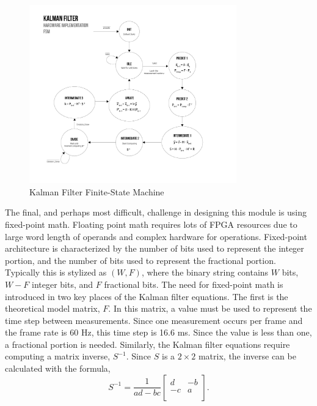\documentclass[11pt]{article} %
\begin{document}
\FloatBarrier
\begin{figure}[h]
\centering
\includegraphics[width=0.8\textwidth]{./images/kalman_fsm.jpg}
\caption{Kalman Filter Finite-State Machine}
\label{fig:kalmanFSM}
\end{figure}
\FloatBarrier
The final, and perhaps most difficult, challenge in designing this module is using fixed-point math. Floating point math requires lots of FPGA resources due to large word length of operands and complex hardware for operations. Fixed-point architecture is characterized by the number of bits used to represent the integer portion, and the number of bits used to represent the fractional portion. Typically this is stylized as $(W, F)$, where the binary string contains $W$ bits, $W-F$ integer bits, and $F$ fractional bits. The need for fixed-point math is introduced in two key places of the Kalman filter equations. The first is the theoretical model matrix, $F$. In this matrix, a value must be used to represent the time step between measurements. Since one measurement occurs per frame and the frame rate is 60 Hz, this time step is 16.6 ms. Since the value is less than one, a fractional portion is needed. Similarly, the Kalman filter equations require computing a matrix inverse, $S^{-1}$. Since $S$ is a $2 \times 2$ matrix, the inverse can be calculated with the formula,
\begin{equation}
S^{-1} = \frac{1}{ad - bc}
\begin{bmatrix}
d & -b \\
-c & a \\
\end{bmatrix}.
\label{eq:inv}
\end{equation}
\end{document}
